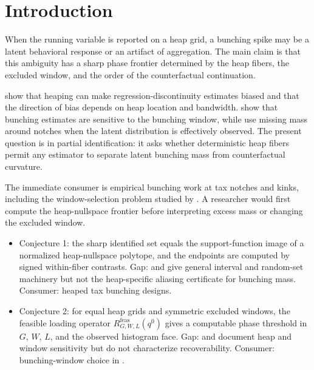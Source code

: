 \documentclass[11pt]{article}
\theoremstyle{definition}
\theoremstyle{plain}
\theoremstyle{remark}
\begin{document}
\section{Introduction}
When the running variable is reported on a heap grid, a bunching spike may be a latent behavioral response or an artifact of aggregation.  The main claim is that this ambiguity has a sharp phase frontier determined by the heap fibers, the excluded window, and the order of the counterfactual continuation.

\citet[p.~2]{BarrecaLindoWaddell2016HeapingRD} show that heaping can make regression-discontinuity estimates biased and that the direction of bias depends on heap location and bandwidth.  \citet[Sec.~4]{BoschDekkerStrohmaier2020Window} show that bunching estimates are sensitive to the bunching window, while \citet[p.~3]{KlevenWaseem2013Notches} use missing mass around notches when the latent distribution is effectively observed.  The present question is in partial identification: it asks whether deterministic heap fibers permit any estimator to separate latent bunching mass from counterfactual curvature.

The immediate consumer is empirical bunching work at tax notches and kinks, including the window-selection problem studied by \citet{BoschDekkerStrohmaier2020Window}.  A researcher would first compute the heap-nullspace frontier before interpreting excess mass or changing the excluded window.

\begin{itemize}[leftmargin=*]
\item Conjecture 1: the sharp identified set equals the support-function image of a normalized heap-nullspace polytope, and the endpoints are computed by signed within-fiber contrasts. Gap: \citet[Sec.~2, pp.~522--524]{ManskiTamer2002IntervalData} and \citet[Sec.~2, pp.~1790--1794]{BeresteanuMolchanovMolinari2011ConvexMoment} give general interval and random-set machinery but not the heap-specific aliasing certificate for bunching mass. Consumer: heaped tax bunching designs.
\item Conjecture 2: for equal heap grids and symmetric excluded windows, the feasible loading operator \(R^{\mathrm{feas}}_{G,W,L}(q^0)\) gives a computable phase threshold in \(G\), \(W\), \(L\), and the observed histogram face. Gap: \citet{BarrecaLindoWaddell2016HeapingRD} and \citet{BoschDekkerStrohmaier2020Window} document heap and window sensitivity but do not characterize recoverability. Consumer: bunching-window choice in \citet{BoschDekkerStrohmaier2020Window}.
\end{itemize}
\end{document}
